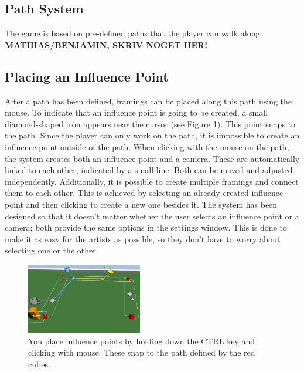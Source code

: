 \subsection{Path System}
The game is based on pre-defined paths that the player can walk along.
\textbf{MATHIAS/BENJAMIN, SKRIV NOGET HER!}

\subsection{Placing an Influence Point}
After a path has been defined, framings can be placed along this path using the mouse. To indicate that an influence point is going to be created, a small diamond-shaped icon appears near the cursor (see Figure \ref{fig:placingInfluencePoint}). This point snaps to the path. Since the player can only work on the path, it is impossible to create an influence point outside of the path. When clicking with the mouse on the path, the system creates both an influence point and a camera. These are automatically linked to each other, indicated by a small line. Both can be moved and adjusted independently. Additionally, it is possible to create multiple framings and connect them to each other. This is achieved by selecting an already-created influence point and then clicking to create a new one besides it. The system has been designed so that it doesn't matter whether the user selects an influence point or a camera; both provide the same options in the settings window. This is done to make it as easy for the artists as possible, so they don't have to worry about selecting one or the other.

\begin{figure}[htbp]
\centering
\includegraphics[width=0.45\textwidth]{Pics/placingInfluencePoint}
\caption{You place influence points by holding down the CTRL key and clicking with mouse. These snap to the path defined by the red cubes.}
\label{fig:placingInfluencePoint}
\end{figure}

